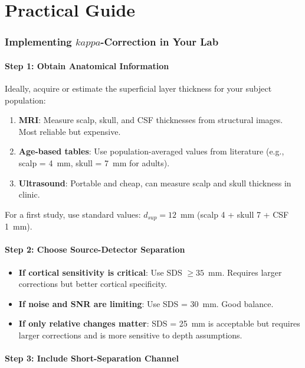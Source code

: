\documentclass[12pt]{article}
\def\kappa{kappa}%
\def\text#1{#1}%
\begin{document}
\newpage
\part{Practical Guide}

\section{Implementing \texorpdfstring{$\kappa$}{kappa}-Correction in Your Lab}

\subsection{Step 1: Obtain Anatomical Information}

Ideally, acquire or estimate the superficial layer thickness for your subject population:

\begin{enumerate}
\item \textbf{MRI}: Measure scalp, skull, and CSF thicknesses from structural images. Most reliable but expensive.
\item \textbf{Age-based tables}: Use population-averaged values from literature (e.g., scalp = 4~mm, skull = 7~mm for adults).
\item \textbf{Ultrasound}: Portable and cheap, can measure scalp and skull thickness in clinic.
\end{enumerate}

For a first study, use standard values: $d_{\text{sup}} = 12$~mm (scalp 4 + skull 7 + CSF 1~mm).

\subsection{Step 2: Choose Source-Detector Separation}

\begin{itemize}
\item \textbf{If cortical sensitivity is critical}: Use SDS $\geq 35$~mm. Requires larger corrections but better cortical specificity.
\item \textbf{If noise and SNR are limiting}: Use SDS = 30~mm. Good balance.
\item \textbf{If only relative changes matter}: SDS = 25~mm is acceptable but requires larger corrections and is more sensitive to depth assumptions.
\end{itemize}

\subsection{Step 3: Include Short-Separation Channel}
\end{document}
